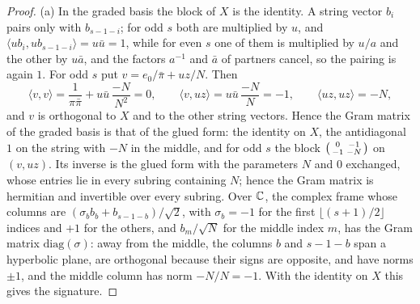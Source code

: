 \begin{proof}
(a) In the graded basis the block of $X$ is the identity. A string vector $b_i$ pairs only with $b_{s-1-i}$; for odd $s$ both are multiplied by $u$, and $\langle ub_i,ub_{s-1-i}\rangle=u\bar u=1$, while for even $s$ one of them is multiplied by $u/a$ and the other by $u\bar a$, and the factors $a^{-1}$ and $\bar a$ of partners cancel, so the pairing is again $1$. For odd $s$ put $v=e_0/\bar\pi+uz/N$. Then
\[
  \langle v,v\rangle=\frac1{\pi\bar\pi}+u\bar u\,\frac{-N}{N^2}=0,\qquad\langle v,uz\rangle=u\bar u\,\frac{-N}{N}=-1,\qquad\langle uz,uz\rangle=-N ,
\]
and $v$ is orthogonal to $X$ and to the other string vectors. Hence the Gram matrix of the graded basis is that of the glued form: the identity on $X$, the antidiagonal $1$ on the string with $-N$ in the middle, and for odd $s$ the block $\begin{psmallmatrix}0&-1\\-1&-N\end{psmallmatrix}$ on $(v,uz)$. Its inverse is the
glued form with the parameters $N$ and $0$ exchanged, whose entries lie in every subring containing $N$; hence the Gram matrix is hermitian and invertible over every subring. Over $\mathbb{C}$, the complex frame whose columns are $(\sigma_bb_b+b_{s-1-b})/\sqrt2$, with $\sigma_b=-1$ for the first $\lfloor(s+1)/2\rfloor$ indices and $+1$ for the others, and $b_m/\sqrt N$ for
the middle index $m$, has the Gram matrix $\mathrm{diag}(\sigma)$: away from the middle, the columns $b$ and $s-1-b$ span a hyperbolic plane, are orthogonal because their signs are opposite, and have norms $\pm1$, and the middle column has norm $-N/N=-1$. With the identity on $X$ this gives the signature.


\end{proof}
